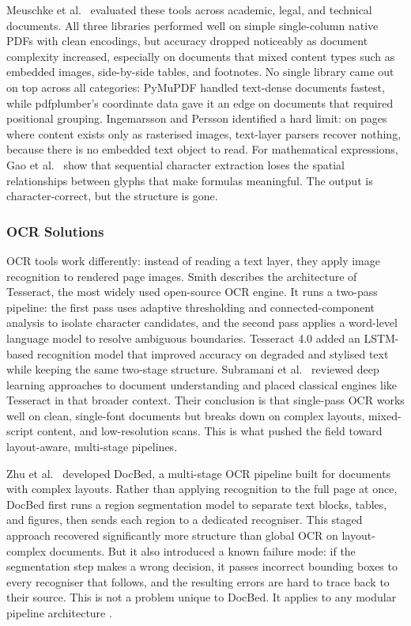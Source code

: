 \documentclass[12pt]{article}
\begin{document}
Meuschke et al.\ \cite{meuschke2023} evaluated these tools across academic,
legal, and technical documents. All three libraries performed well on simple
single-column native PDFs with clean encodings, but accuracy dropped noticeably
as document complexity increased, especially on documents that mixed content
types such as embedded images, side-by-side tables, and footnotes. No single
library came out on top across all categories: PyMuPDF handled text-dense
documents fastest, while pdfplumber's coordinate data gave it an edge on
documents that required positional grouping. Ingemarsson and Persson \cite{ingemarsson2024} identified
a hard limit: on pages where content exists only as rasterised images,
text-layer parsers recover nothing, because there is no embedded text object
to read. For mathematical expressions, Gao et al.\ \cite{gao2011} show that
sequential character extraction loses the spatial relationships between glyphs
that make formulas meaningful. The output is character-correct, but the
structure is gone.

\subsubsection{OCR Solutions}

OCR tools work differently: instead of reading a text layer, they apply image
recognition to rendered page images. Smith \cite{smith2007} describes the
architecture of Tesseract, the most widely used open-source OCR engine. It
runs a two-pass pipeline: the first pass uses adaptive thresholding and
connected-component analysis to isolate character candidates, and the second
pass applies a word-level language model to resolve ambiguous boundaries.
Tesseract 4.0 added an LSTM-based recognition model that improved accuracy on
degraded and stylised text while keeping the same two-stage structure.
Subramani et al.\ \cite{subramani2020} reviewed deep learning approaches to
document understanding and placed classical engines like Tesseract in that
broader context. Their conclusion is that single-pass OCR works well on clean,
single-font documents but breaks down on complex layouts, mixed-script content,
and low-resolution scans. This is what pushed the field toward layout-aware,
multi-stage pipelines.

Zhu et al.\ \cite{zhu2022} developed DocBed, a multi-stage OCR pipeline built
for documents with complex layouts. Rather than applying recognition to the
full page at once, DocBed first runs a region segmentation model to separate
text blocks, tables, and figures, then sends each region to a dedicated
recogniser. This staged approach recovered significantly more structure than
global OCR on layout-complex documents. But it also introduced a known failure
mode: if the segmentation step makes a wrong decision, it passes incorrect
bounding boxes to every recogniser that follows, and the resulting errors are
hard to trace back to their source. This is not a problem unique to DocBed.
It applies to any modular pipeline architecture \cite{duan2025}.
\end{document}
